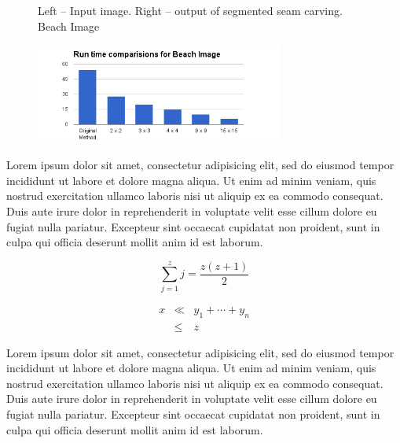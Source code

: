 \documentclass[conference]{acmsiggraph}
\begin{document}
\begin{figure}[ht]       
    \caption{Left -- Input image. Right -- output of segmented seam carving. Beach Image}
    \label{materialflowChart}
\end{figure}


\begin{figure}[ht]
  \centering
  \includegraphics[width=3.2in]{images/beach}
\end{figure}


Lorem ipsum dolor sit amet, consectetur adipisicing elit, sed do
eiusmod tempor incididunt ut labore et dolore magna aliqua. Ut enim ad
minim veniam, quis nostrud exercitation ullamco laboris nisi ut
aliquip ex ea commodo consequat. Duis aute irure dolor in
reprehenderit in voluptate velit esse cillum dolore eu fugiat nulla
pariatur. Excepteur sint occaecat cupidatat non proident, sunt in
culpa qui officia deserunt mollit anim id est laborum.

\begin{equation}
 \sum_{j=1}^{z} j = \frac{z(z+1)}{2}
\end{equation}

\begin{eqnarray}
x & \ll & y_{1} + \cdots + y_{n} \\
  & \leq & z
\end{eqnarray}

Lorem ipsum dolor sit amet, consectetur adipisicing elit, sed do
eiusmod tempor incididunt ut labore et dolore magna aliqua. Ut enim ad
minim veniam, quis nostrud exercitation ullamco laboris nisi ut
aliquip ex ea commodo consequat. Duis aute irure dolor in
reprehenderit in voluptate velit esse cillum dolore eu fugiat nulla
pariatur. Excepteur sint occaecat cupidatat non proident, sunt in
culpa qui officia deserunt mollit anim id est laborum.
\end{document}
